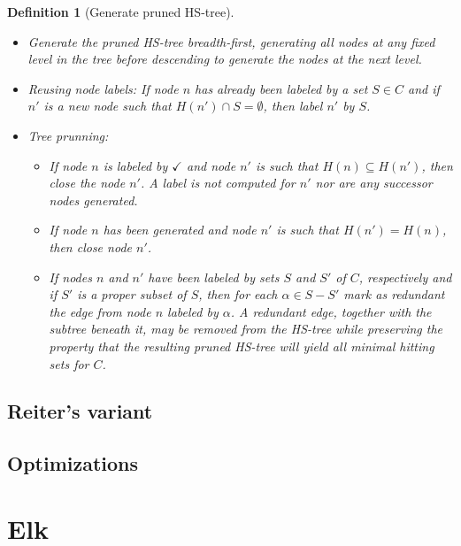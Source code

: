 \documentclass[12pt,a4paper]{article}
\newtheorem{definition}{Definition}[subsection]
\begin{document}
\begin{definition}[Generate pruned HS-tree]{\indent}
	\begin{itemize}
		\item Generate the pruned HS-tree breadth-first, generating all nodes at any fixed level in the tree before descending to generate the nodes at the next level.
		
		\item Reusing node labels: If node $n$ has already been labeled by a set $S \in C$ and if $n'$ is a new node such that $H(n') \cap S = \emptyset$, then label $n'$ by $S$.
		
		\item Tree prunning:
		
		\begin{itemize}
			\item If node $n$ is labeled by $\checkmark$ and node $n'$ is such that $H(n) \subseteq H(n')$, then close the node $n'$. A label is not computed for $n'$ nor are any successor nodes generated.
			
			\item If node $n$ has been generated and node $n'$ is such that $H(n') = H(n)$, then close node $n'$.
			
			\item If nodes $n$ and $n'$ have been labeled by sets $S$ and $S'$ of $C$, respectively and if $S'$ is a proper subset of $S$, then for each $\alpha \in S - S'$ mark as redundant the edge from node $n$ labeled by $\alpha$. A redundant edge, together with the subtree beneath it, may be removed from the HS-tree while preserving the property that the resulting pruned HS-tree will yield all minimal hitting sets for $C$.
			
		\end{itemize}	
		
	\end{itemize}
	
\end{definition}

\subsection{Reiter's variant}

\subsection{Optimizations}

\section{Elk}
\end{document}
